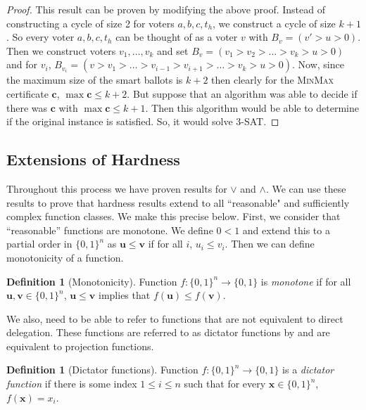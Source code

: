 \documentclass[11pt,a4paper, titlepage]{article}
\theoremstyle{definition}
\newtheorem{definition}[theorem]{Definition}
\let\vec\mathbf
\begin{document}
\begin{proof}
    This result can be proven by modifying the above proof. Instead of constructing a cycle of size 2 for voters $a, b, c, t_h$, we construct a cycle of size $k + 1$. So every voter $a, b, c, t_h$ can be thought of as a voter $v$ with $B_v = (v' > u > 0)$. Then we construct voters $v_1, \ldots, v_k$ and set $B_v = (v_1 > v_2 > \ldots > v_k > u > 0)$ and for $v_i$, $B_{v_i} = (v > v_1 > \ldots > v_{i - 1} > v_{i+1} > \ldots > v_k > u > 0)$.
    Now, since the maximum size of the smart ballots is $k + 2$ then clearly for the \textsc{MinMax} certificate $\vec{c}$, $\max{\vec{c}} \leq k + 2$. 
    But suppose that an algorithm was able to decide if there was $\vec{c}$ with $\max{\vec{c}} \leq k + 1$. Then this algorithm would be able to determine if the original instance is satisfied. So, it would solve \textsc{3-SAT}.
\end{proof}

\subsection{Extensions of Hardness}

Throughout this process we have proven results for $\lor$ and $\land$.
We can use these results to prove that hardness results extend to all ``reasonable" and sufficiently complex function classes.
We make this precise below.
First, we consider that ``reasonable'' functions are monotone. 
We define $0 < 1$ and extend this to a partial order in $\{0,1\}^n$ as $\vec{u} \leq \vec{v}$ if for all $i$, $u_i \leq v_i$.
Then we can define monotonicity of a function.

\begin{definition}[Monotonicity]
    \label{monotonicity}
    Function $f\colon \{0, 1\}^n \longrightarrow \{0, 1\}$ is \emph{monotone} if for all $\vec{u}, \vec{v} \in \{0,1\}^n$, $\vec{u} \leq \vec{v}$ implies that $f(\vec{u}) \leq f(\vec{v})$.
\end{definition}

We also, need to be able to refer to functions that are not equivalent to direct delegation. 
These functions are referred to as dictator functions by \cite{boolean} and are equivalent to projection functions.

\begin{definition}[Dictator functions]
    Function $f \colon \{0, 1\}^n \longrightarrow \{0, 1\}$ is a \emph{dictator function} if there is some index $1 \leq i \leq n$ such that for every $\vec{x} \in \{0, 1\}^n$, $f(\vec{x}) = x_i$.
\end{definition}
\end{document}
